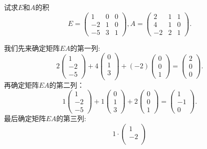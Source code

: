 ﻿\documentclass{book} \usepackage{exsheets} \usepackage{xeCJK}
\begin{document}
\begin{question}
  试求$E$和$A$的积
$$
E=
\begin{pmatrix}
  1&0&0\\
  -2&1&0\\
  -5&3&1
\end{pmatrix},A=
\begin{pmatrix}
  2&1&1\\
  4&1&0\\
  -2&2&1
\end{pmatrix}.
$$
\end{question}
\begin{solution}
  我们先来确定矩阵$EA$的第一列:
$$
2
\begin{pmatrix}
  1\\
  -2\\
  -5
\end{pmatrix}+4
\begin{pmatrix}
  0\\
  1\\
  3\\
\end{pmatrix}+(-2)
\begin{pmatrix}
  0\\
  0\\
  1
\end{pmatrix}=
\begin{pmatrix}
  2\\
  0\\
  0
\end{pmatrix}.
$$
再确定矩阵$EA$的第二列：
$$
1
\begin{pmatrix}
  1\\
  -2\\
  -5
\end{pmatrix}+1
\begin{pmatrix}
  0\\
  1\\
  3
\end{pmatrix}+2
\begin{pmatrix}
  0\\
  0\\
  1
\end{pmatrix}=
\begin{pmatrix}
  1\\
  -1\\
  0
\end{pmatrix}.
$$
最后确定矩阵$EA$的第三列:
$$
1\cdot
\begin{pmatrix}
  1\\
  -2\\

\end{pmatrix}$$
\end{solution}
\end{document}
